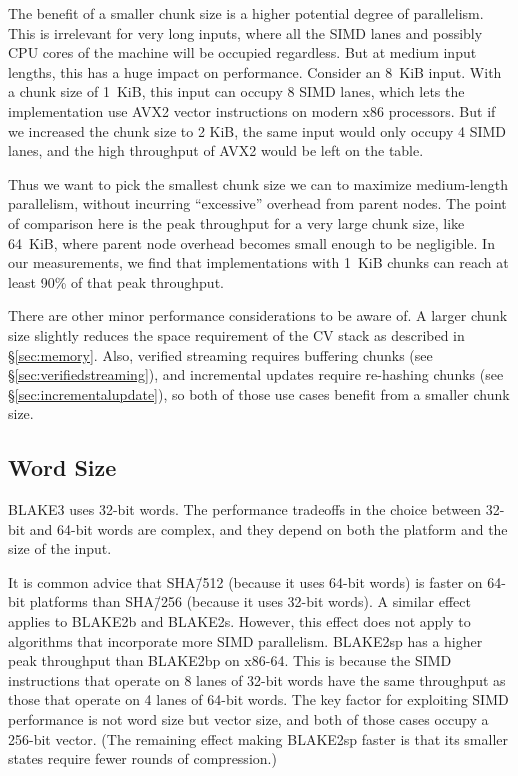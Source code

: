 \documentclass[11pt,notitlepage,a4paper]{article}
\begin{document}
The benefit of a smaller chunk size is a higher potential degree of
parallelism. This is irrelevant for very long inputs, where all the SIMD lanes
and possibly CPU cores of the machine will be occupied regardless. But at
medium input lengths, this has a huge impact on performance. Consider an 8~KiB
input. With a chunk size of 1~KiB, this input can occupy 8 SIMD lanes, which
lets the implementation use AVX2 vector instructions on modern x86 processors.
But if we increased the chunk size to 2 KiB, the same input would only occupy 4
SIMD lanes, and the high throughput of AVX2 would be left on the table.

Thus we want to pick the smallest chunk size we can to maximize medium-length
parallelism, without incurring ``excessive'' overhead from parent nodes. The
point of comparison here is the peak throughput for a very large chunk size,
like 64~KiB, where parent node overhead becomes small enough to be negligible.
In our measurements, we find that implementations with 1~KiB chunks can reach
at least 90\% of that peak throughput.

There are other minor performance considerations to be aware of. A larger chunk
size slightly reduces the space requirement of the CV stack as described in
\S\ref{sec:memory}. Also, verified streaming requires buffering chunks (see
\S\ref{sec:verifiedstreaming}), and incremental updates require re-hashing
chunks (see \S\ref{sec:incrementalupdate}), so both of those use cases benefit
from a smaller chunk size.

\subsection{Word Size}\label{sec:wordsize}

BLAKE3 uses 32-bit words. The performance tradeoffs in the choice between
32-bit and 64-bit words are complex, and they depend on both the platform and
the size of the input.

It is common advice that SHA\=/512 (because it uses 64-bit words) is faster on
64-bit platforms than SHA\=/256 (because it uses 32-bit words). A similar
effect applies to BLAKE2b and BLAKE2s. However, this effect does not apply to
algorithms that incorporate more SIMD parallelism. BLAKE2sp has a higher peak
throughput than BLAKE2bp on x86-64. This is because the SIMD instructions that
operate on 8 lanes of 32-bit words have the same throughput as those that
operate on 4 lanes of 64-bit words. The key factor for exploiting SIMD
performance is not word size but vector size, and both of those cases occupy a
256-bit vector. (The remaining effect making BLAKE2sp faster is that its
smaller states require fewer rounds of compression.)
\end{document}
